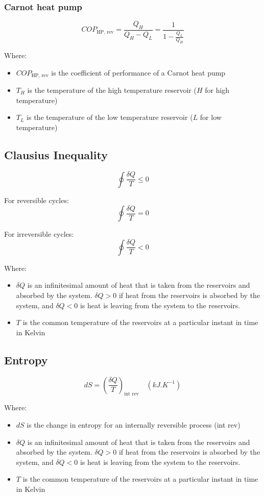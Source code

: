 \documentclass[11pt]{article}
\begin{document}
\subsubsection{Carnot heat pump}
\label{sec:org7bc41b3}
\[COP_{\text{HP, rev}} = \frac{Q_H}{Q_H - Q_L} = \frac{1}{1 - \frac{Q_L}{Q_H}}\]

Where:
\begin{itemize}
\item \(COP_{\text{HP, rev}}\) is the coefficient of performance of a Carnot heat pump
\item \(T_{H}\) is the temperature of the high temperature reservoir (\(H\) for high temperature)
\item \(T_{L}\) is the temperature of the low temperature reservoir (\(L\) for low temperature)
\end{itemize}

 \newpage

\subsection{Clausius Inequality}
\label{sec:org539568d}
\[\oint \frac{\delta Q}{T} \leq 0\]

For reversible cycles:
\[\oint \frac{\delta Q}{T} = 0\]

For irreversible cycles:
\[\oint \frac{\delta Q}{T} < 0\]

Where:
\begin{itemize}
\item \(\delta Q\) is an infinitesimal amount of heat that is taken from the reservoirs and absorbed by the system. \(\delta Q > 0\) if heat from the reservoirs is absorbed by the system, and \(\delta Q < 0\) is heat is leaving from the system to the reservoirs.
\item \(T\) is the common temperature of the reservoirs at a particular instant in time in Kelvin
\end{itemize}

\subsection{Entropy}
\label{sec:org11c9b71}
\[dS = \left(\frac{\delta Q}{T} \right)_{\text{int rev}} \quad \left(\unit{kJ.K^{-1}}\right)\]

Where:
\begin{itemize}
\item \(dS\) is the change in entropy for an internally reversible process (int rev)
\item \(\delta Q\) is an infinitesimal amount of heat that is taken from the reservoirs and absorbed by the system. \(\delta Q > 0\) if heat from the reservoirs is absorbed by the system, and \(\delta Q < 0\) is heat is leaving from the system to the reservoirs.
\item \(T\) is the common temperature of the reservoirs at a particular instant in time in Kelvin
\end{itemize}
\end{document}
